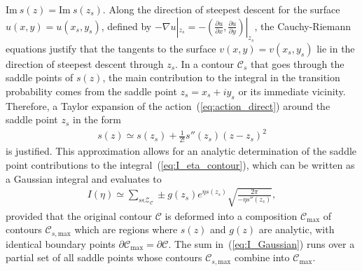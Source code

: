 $\mathrm{Im}\ s(z) = \mathrm{Im}\ s(z_{s})$. Along the direction of
steepest descent for the surface $u(x,y) = u(x_{s},y_{s})$, defined by
$-\nabla u|_{z_{s}} = - (\frac{\partial u}{\partial x}, \frac{\partial
  u}{\partial y})|_{z_{s}}$, the Cauchy-Riemann equations justify that
the tangents to the surface $v(x,y) = v(x_{s},y_{s})$ lie in the
direction of steepest descent through $z_{s}$. In a contour
$\mathcal{C}_{s}$ that goes through the saddle points of $s(z)$, the
main contribution to the integral in the transition probability comes
from the saddle point $z_{s} = x_{s} + iy_{s}$ or its immediate
vicinity. Therefore, a Taylor expansion of the
action~(\ref{eq:action_direct}) around the saddle point $z_{s}$ in the
form
%
\begin{eqnarray}
  \label{eq:taylor_exp}
  s(z) \simeq s(z_{s}) + \frac{1}{2!}s''(z_{s})(z - z_{s})^{2} 
\end{eqnarray}
%
is justified. This approximation allows for an analytic determination
of the saddle point contributions to the
integral~(\ref{eq:I_eta_contour}), which can be written as a Gaussian
integral and evaluates to~\cite{phd_Kopold}
%
\begin{eqnarray}
  \label{eq:I_Gaussian}
  I(\eta) \simeq \sum\limits_{s\mathrm{\epsilon} \mathcal{Z}_{\mathcal{C}}}
  \pm g(z_{s}) e^{\eta s(z_{s})} \sqrt{\frac{2\pi}{-\eta s''(z_{s})}},
\end{eqnarray}
%
provided that the original contour $\mathcal{C}$ is deformed into a
composition $\mathcal{C}_{\mathrm{max}}$ of contours
$\mathcal{C}_{s,\mathrm{max}}$ which are regions where $s(z)$ and
$g(z)$ are analytic, with identical boundary points
$\partial\mathcal{C}_{\mathrm{max}} = \partial\mathcal{C}$. The sum
in~(\ref{eq:I_Gaussian}) runs over a partial set of all saddle points
whose contours $\mathcal{C}_{s,\mathrm{max}}$ combine into
$\mathcal{C}_{\mathrm{max}}$.

